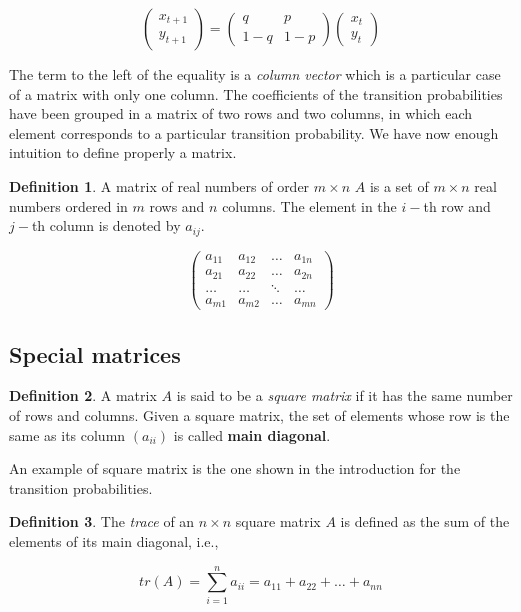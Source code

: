 \documentclass[a4paper,11pt]{article}
\theoremstyle{definition}
\newtheorem{definition}{Definition}
\theoremstyle{plain}
\begin{document}
\[
\begin{pmatrix} x_{t+1} \\ y_{t+1} \end{pmatrix} = \begin{pmatrix} q & p \\ 1-q & 1-p \end{pmatrix}\begin{pmatrix} x_t \\ y_t \end{pmatrix}
\]

The term to the left of the equality is a \emph{column vector} which is
a particular case of a matrix with only one column. The coefficients of
the transition probabilities have been grouped in a matrix of two rows
and two columns, in which each element corresponds to a particular
transition probability. We have now enough intuition to define properly
a matrix.

\begin{definition}
A matrix of real numbers of order \(m \times n\)
\(A\) is a set of \(m\times n\) real numbers ordered in \(m\) rows and
\(n\) columns. The element in the \(i-\)th row and \(j-\)th column is
denoted by \(a_{ij}\).

\[
\begin{pmatrix} a_{11} & a_{12} & \ldots & a_{1n} \\ a_{21} & a_{22} & \ldots & a_{2n} \\ \ldots & \ldots & \ddots & \ldots \\ a_{m1} & a_{m2} & \ldots & a_{mn} \end{pmatrix}
\]
\end{definition}

\subsection{Special matrices}\label{special-matrices}

\begin{definition}
A matrix \(A\) is said to be a \emph{square matrix}
if it has the same number of rows and columns. Given a square matrix,
the set of elements whose row is the same as its column \((a_{ii})\) is
called \textbf{main diagonal}.
\end{definition}

An example of square matrix is the one shown in the introduction for the
transition probabilities.

\begin{definition}
The \emph{trace} of an \(n\times n\) square matrix
\(A\) is defined as the sum of the elements of its main diagonal, i.e.,

\[
tr(A) = \sum^n_{i=1} a_{ii} = a_{11} + a_{22} + \ldots + a_{nn}
\]
\end{definition}
\end{document}
